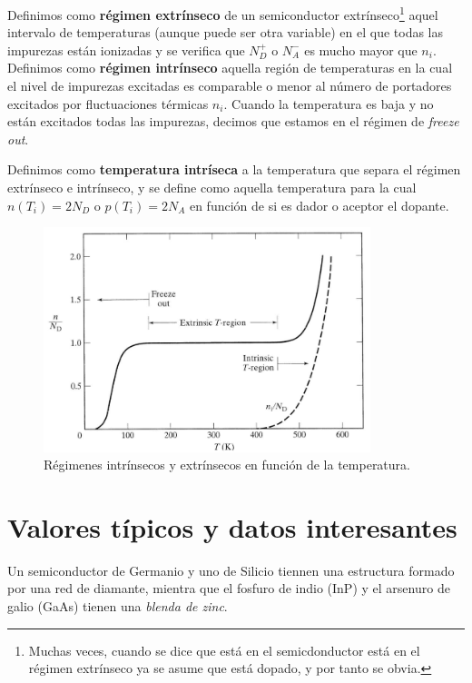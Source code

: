 Definimos como \textbf{régimen extrínseco} de un semiconductor extrínseco\footnote{Muchas veces, cuando se dice que está en el semicdonductor está en el régimen extrínseco ya se asume que está dopado, y por tanto se obvia.} aquel intervalo de temperaturas (aunque puede ser otra variable) en el que todas las impurezas están ionizadas y se verifica que $N_D^+$ o $N_A^-$ es mucho mayor que $n_i$. Definimos como \textbf{régimen intrínseco} aquella región de temperaturas en la cual el nivel de impurezas excitadas es comparable o menor al número de portadores excitados por fluctuaciones térmicas $n_i$. Cuando la temperatura es baja y no están excitados todas las impurezas, decimos que estamos en el régimen de \textit{freeze out}.

Definimos como \textbf{temperatura intríseca} a la temperatura que separa el régimen extrínseco e intrínseco, y se define como aquella temperatura para la cual $n(T_i)=2N_D$ o $p(T_i)=2N_A$ en función de si es dador o aceptor el dopante.


\begin{figure}[h!] \centering
	\includegraphics[width=0.85\textwidth]{Cuerpo/Ch_01/01_06.png}
	\caption{Régimenes intrínsecos y extrínsecos en función de la temperatura.}
\end{figure}



\section{Valores típicos y datos interesantes}

Un semiconductor de Germanio y uno de Silicio tiennen una estructura formado por una red de diamante, mientra que el fosfuro de indio (InP) y el arsenuro de galio (GaAs) tienen una \textit{blenda de zinc}.







